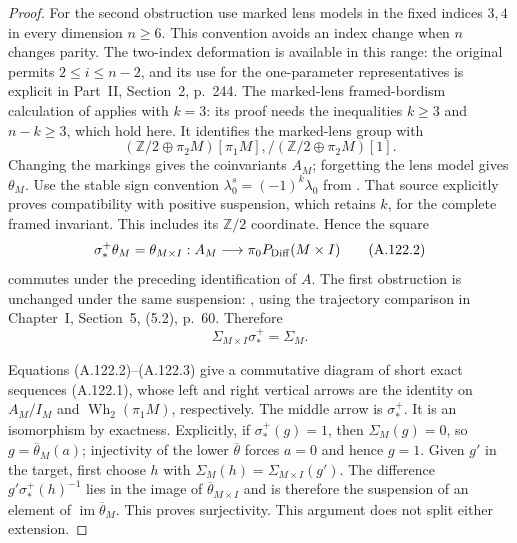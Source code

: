 \begin{proof}
For the second obstruction use marked lens models in the fixed
indices $3,4$ in every dimension $n\geq6$. This convention avoids
an index change when $n$ changes parity. The two-index deformation
is available in this range: the original
\cite[Part~I, Chapter~V, Theorem~3.1(a), p.~184]
{HatcherWagoner1973} permits $2\leq i\leq n-2$, and its use for
the one-parameter representatives is explicit in Part~II, Section~2,
p.~244. The marked-lens framed-bordism calculation of
\cite[Theorem~1.8 and Lemma~1.10, pp.~8--9]
{Igusa2021SecondObstructionI} applies with $k=3$: its proof needs
the inequalities $k\geq3$ and $n-k\geq3$, which hold here.
It identifies the marked-lens group with
\[
 (\mathbb Z/2\oplus\pi_2M)[\pi_1M],/
       (\mathbb Z/2\oplus\pi_2M)[1].
\]
Changing the markings gives the coinvariants $A_M$; forgetting the
lens model gives $\theta_M$. Use the stable sign convention
$\lambda_0^s=(-1)^k\lambda_0$ from
\cite[Section~4.2, pp.~8--9]{Igusa2021Dimension3}.
That source explicitly proves compatibility with positive
suspension, which retains $k$, for the complete framed invariant.
This includes its $\mathbb Z/2$ coordinate. Hence the square
\[
 \sigma^+_*\theta_M=\theta_{M\times I}
       : A_M\longrightarrow\pi_0P_{\rm Diff}(M\times I)
                                                               \tag{A.122.2}
\]
commutes under the preceding identification of $A$.
The first obstruction is unchanged under the same suspension:
\cite[Part~I, Chapter~IV, Section~1, Remark, p.~130]
{HatcherWagoner1973}, using the trajectory comparison in
Chapter~I, Section~5, (5.2), p.~60. Therefore
\[
       \Sigma_{M\times I}\sigma^+_* =\Sigma_M.          \tag{A.122.3}
\]

Equations (A.122.2)--(A.122.3) give a commutative diagram of
short exact sequences (A.122.1), whose left and right vertical
arrows are the identity on $A_M/I_M$ and
$\operatorname{Wh}_2(\pi_1M)$, respectively. The middle arrow is
$\sigma^+_*$. It is an isomorphism by exactness. Explicitly, if
$\sigma^+_*(g)=1$, then $\Sigma_M(g)=0$, so
$g=\overline\theta_M(a)$; injectivity of the lower
$\overline\theta$ forces $a=0$ and hence $g=1$.
Given $g'$ in the target, first choose $h$ with
$\Sigma_M(h)=\Sigma_{M\times I}(g')$. The difference
$g'\sigma^+_*(h)^{-1}$ lies in the image of
$\overline\theta_{M\times I}$ and is therefore the suspension of
an element of $\operatorname{im}\overline\theta_M$. This proves
surjectivity. This argument does not split either extension.


\end{proof}
